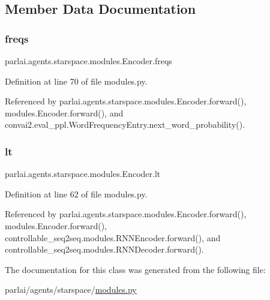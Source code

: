 \subsection{Member Data Documentation}
\mbox{\label{classparlai_1_1agents_1_1starspace_1_1modules_1_1Encoder_aaf45c31c5a3014cef4892cf836ebedb0}} 
\subsubsection{\texorpdfstring{freqs}{freqs}}
{\footnotesize\ttfamily parlai.\+agents.\+starspace.\+modules.\+Encoder.\+freqs}



Definition at line 70 of file modules.\+py.



Referenced by parlai.\+agents.\+starspace.\+modules.\+Encoder.\+forward(), modules.\+Encoder.\+forward(), and convai2.\+eval\+\_\+ppl.\+Word\+Frequency\+Entry.\+next\+\_\+word\+\_\+probability().

\mbox{\label{classparlai_1_1agents_1_1starspace_1_1modules_1_1Encoder_a86957630e34a988b80074fbaeae14d7a}} 
\subsubsection{\texorpdfstring{lt}{lt}}
{\footnotesize\ttfamily parlai.\+agents.\+starspace.\+modules.\+Encoder.\+lt}



Definition at line 62 of file modules.\+py.



Referenced by parlai.\+agents.\+starspace.\+modules.\+Encoder.\+forward(), modules.\+Encoder.\+forward(), controllable\+\_\+seq2seq.\+modules.\+R\+N\+N\+Encoder.\+forward(), and controllable\+\_\+seq2seq.\+modules.\+R\+N\+N\+Decoder.\+forward().



The documentation for this class was generated from the following file\+:\begin{DoxyCompactItemize}
\item 
parlai/agents/starspace/\hyperlink{parlai_2agents_2starspace_2modules_8py}{modules.\+py}\end{DoxyCompactItemize}
